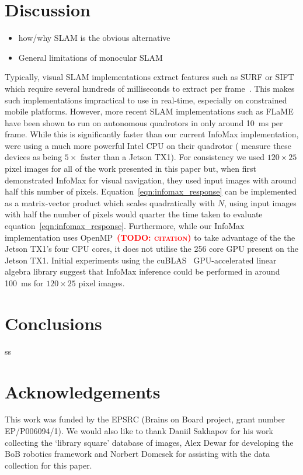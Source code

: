 \documentclass[letterpaper]{article}
\newcommand{\todo}[1]{\textbf{\textsc{\textcolor{red}{(TODO: #1)}}}}
\begin{document}
\section{Discussion}
\begin{itemize}
    \item how/why SLAM is the obvious alternative
    \item General limitations of monocular SLAM
\end{itemize}
Typically, visual SLAM implementations extract features such as SURF or SIFT which require several hundreds of milliseconds to extract per frame~\citep{Bay2006}. 
This makes such implementations impractical to use in real-time, especially on constrained mobile platforms. 
However, more recent SLAM implementations such as FLaME~\citep{Greene2017} have been shown to run on autonomous quadrotors in only around \SI{10}{\milli\second} per frame. 
While this is significantly faster than our current InfoMax implementation, \citet{Greene2017} were using a much more powerful Intel CPU on their quadrotor (\citet{Biddulph2018} measure these devices as being $5\times$ faster than a Jetson TX1). 
For consistency we used $120 \times 25$ pixel images for all of the work presented in this paper but, when \citet{Baddeley2012} first demonstrated InfoMax for visual navigation, they used input images with around half this number of pixels.
Equation~\ref{eqn:infomax_response} can be implemented as a matrix-vector product which scales quadratically with $N$, using input images with half the number of pixels would quarter the time taken to evaluate equation~\ref{eqn:infomax_response}.
Furthermore, while our InfoMax implementation uses OpenMP~\todo{citation} to take advantage of the the Jetson TX1's four CPU cores, it does not utilise the \num{256} core GPU present on the Jetson TX1.
Initial experiments using the cuBLAS~\citep{NVIDIACorporation2007} GPU-accelerated linear algebra library suggest that InfoMax inference could be performed in around \SI{100}{\milli\second} for $120 \times 25$ pixel images.

\section{Conclusions}
ss
\section{Acknowledgements}
This work was funded by the EPSRC (Brains on Board project, grant number EP/P006094/1).
We would also like to thank Daniil Sakhapov for his work collecting the `library square' database of images, Alex Dewar for developing the BoB robotics framework and Norbert Domcsek for assisting with the data collection for this paper. 

\footnotesize

\end{document}
